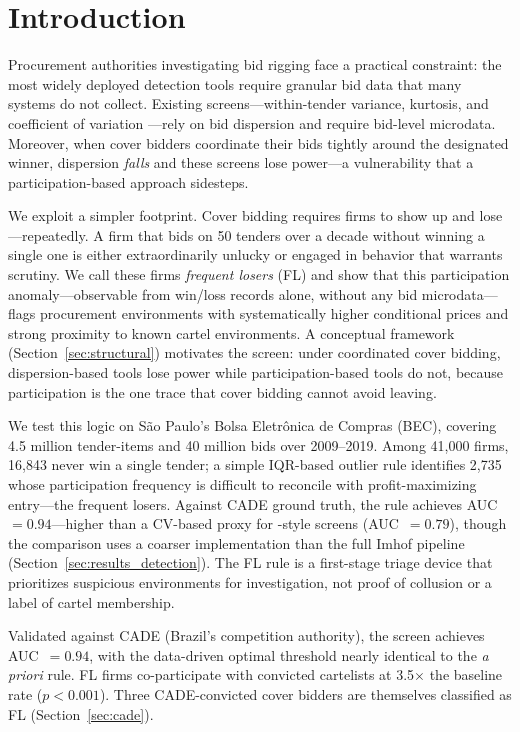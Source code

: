 \section{Introduction}
\label{sec:intro}

Procurement authorities investigating bid rigging face a practical
constraint: the most widely deployed detection tools require granular
bid data that many systems do not collect.
Existing screens---within-tender variance, kurtosis, and
coefficient of variation
\citep{imhof2019detecting, huber2019machine}---rely on bid
dispersion and require bid-level microdata. Moreover, when cover
bidders coordinate their bids tightly around the designated winner,
dispersion \emph{falls} and these screens lose power---a
vulnerability that a participation-based approach sidesteps.

We exploit a simpler footprint. Cover bidding requires firms to
show up and lose---repeatedly. A firm that bids on 50 tenders
over a decade without winning a single one is either
extraordinarily unlucky or engaged in behavior that warrants
scrutiny. We call these
firms \emph{frequent losers} (FL) and show that this participation
anomaly---observable from win/loss records alone, without any bid
microdata---flags procurement environments with systematically higher
conditional prices and strong proximity to known cartel environments.
A conceptual framework (Section~\ref{sec:structural}) motivates the
screen: under coordinated cover bidding, dispersion-based tools lose
power while participation-based tools do not, because participation
is the one trace that cover bidding cannot avoid leaving.

We test this logic on S\~ao Paulo's Bolsa Eletr\^onica de Compras (BEC),
covering 4.5 million tender-items and 40 million bids over 2009--2019.
Among 41,000 firms, 16,843 never win a single tender; a simple
IQR-based outlier rule identifies 2,735 whose participation frequency
is difficult to reconcile with profit-maximizing entry---the frequent
losers. Against CADE ground truth, the rule achieves
AUC~$= 0.94$---higher than a CV-based proxy for
\citet{imhof2019detecting}-style screens (AUC~$= 0.79$), though the
comparison uses a coarser implementation than the full Imhof pipeline
(Section~\ref{sec:results_detection}).
The FL rule is a first-stage triage device that prioritizes
suspicious environments for investigation, not proof of collusion
or a label of cartel membership.

Validated against CADE (Brazil's competition authority), the screen
achieves AUC~$= 0.94$, with the data-driven optimal threshold nearly
identical to the \emph{a priori} rule. FL firms co-participate with
convicted cartelists at 3.5$\times$ the baseline rate ($p < 0.001$).
Three CADE-convicted cover bidders are themselves classified as FL
(Section~\ref{sec:cade}).

